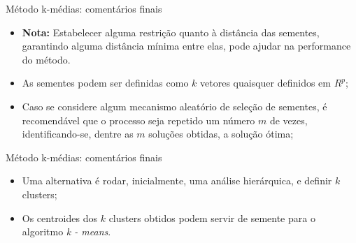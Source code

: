 \documentclass[
  ignorenonframetext,
  aspectratio=169,
]{beamer}
\providecommand{\tightlist}{%
  \setlength{\itemsep}{0pt}\setlength{\parskip}{0pt}}
\begin{document}
\begin{frame}{Método k-médias: comentários finais}
\protect{}\label{muxe9todo-k-muxe9dias-comentuxe1rios-finais-1}
\begin{itemize}
\tightlist
\item
  \textbf{Nota:} Estabelecer alguma restrição quanto à distância das
  sementes, garantindo alguma distância mínima entre elas, pode ajudar
  na performance do método.
\end{itemize}

\pause

\begin{itemize}
\tightlist
\item
  As sementes podem ser definidas como \(k\) vetores quaisquer definidos
  em \(R^p\);
\end{itemize}

\pause

\begin{itemize}
\tightlist
\item
  Caso se considere algum mecanismo aleatório de seleção de sementes, é
  recomendável que o processo seja repetido um número \(m\) de vezes,
  identificando-se, dentre as \(m\) soluções obtidas, a solução ótima;
\end{itemize}
\end{frame}

\begin{frame}{Método k-médias: comentários finais}
\protect{}\label{muxe9todo-k-muxe9dias-comentuxe1rios-finais-2}
\begin{itemize}
\tightlist
\item
  Uma alternativa é rodar, inicialmente, uma análise hierárquica, e
  definir \(k\) clusters;
\end{itemize}

\pause

\begin{itemize}
\tightlist
\item
  Os centroides dos \(k\) clusters obtidos podem servir de semente para
  o algoritmo \emph{k - means}.
\end{itemize}
\end{frame}
\end{document}
